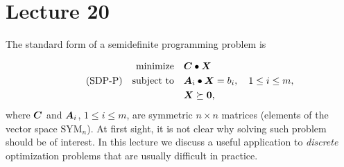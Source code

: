 %
%
% 


\chapter*{Lecture 20}
\setcounter{chapter}{20}
\setcounter{section}{0}
\setcounter{equation}{0}
\setcounter{theorem}{0}


The standard form of a semidefinite programming problem is

\begin{align}\label{eq:sdp-p}\tag{SDP-P}
\begin{split}
 \text{minimize}\quad & \bm{C}\bullet \bm{X}\\
 \quad\text{subject to}\quad & \bm{A}_i\bullet \bm{X} = b_i, \quad 1\leq i\leq m,\\
 & \bm{X} \succeq \bm{0},
 \end{split}
\end{align}
where $\bm{C}$ and $\bm{A}_i$, $1\leq i\leq m$, are symmetric $n\times n$ matrices (elements of the vector space $\mathrm{SYM}_n$). At first sight, it is not clear why solving such problem should be of interest. In this lecture we discuss a useful application to {\em discrete} optimization problems that are usually difficult in practice.

